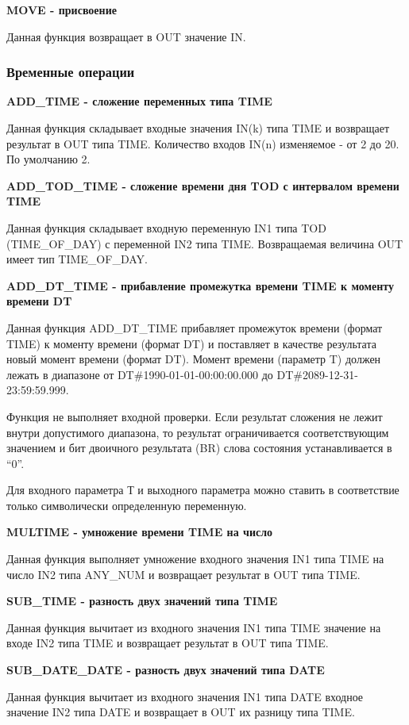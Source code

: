 \documentclass[letterpaper,10pt,russian]{sphinxmanual}
\begin{document}
\textbf{MOVE - присвоение}

Данная функция возвращает в OUT значение IN.


\subsubsection{Временные операции}
\label{usage_guide/library:id5}
\textbf{ADD\_TIME - сложение переменных типа TIME}

Данная функция складывает входные значения IN(k) типа TIME и возвращает
результат в OUT типа TIME. Количество входов IN(n) изменяемое - от 2 до
20. По умолчанию 2.

\textbf{ADD\_TOD\_TIME - сложение времени дня TOD с интервалом времени TIME}

Данная функция складывает входную переменную IN1 типа TOD (TIME\_OF\_DAY)
с переменной IN2 типа TIME. Возвращаемая величина OUT имеет тип
TIME\_OF\_DAY.

\textbf{ADD\_DT\_TIME - прибавление промежутка времени TIME к моменту времени DT}

Данная функция ADD\_DT\_TIME прибавляет промежуток времени (формат TIME) к
моменту времени (формат DT) и поставляет в качестве результата новый
момент времени (формат DT). Момент времени (параметр T) должен лежать в
диапазоне от DT\#1990-01-01-00:00:00.000 до DT\#2089-12-31-23:59:59.999.

Функция не выполняет входной проверки. Если результат сложения не лежит
внутри допустимого диапазона, то результат ограничивается
соответствующим значением и бит двоичного результата (BR) слова
состояния устанавливается в ``0''.

Для входного параметра Т и выходного параметра можно ставить в
соответствие только символически определенную переменную.

\textbf{MULTIME - умножение времени TIME на число}

Данная функция выполняет умножение входного значения IN1 типа TIME на
число IN2 типа ANY\_NUM и возвращает результат в OUT типа TIME.

\textbf{SUB\_TIME - разность двух значений типа TIME}

Данная функция вычитает из входного значения IN1 типа TIME значение на
входе IN2 типа TIME и возвращает результат в OUT типа TIME.

\textbf{SUB\_DATE\_DATE - разность двух значений типа DATE}

Данная функция вычитает из входного значения IN1 типа DATE входное
значение IN2 типа DATE и возвращает в OUT их разницу типа TIME.
\end{document}
